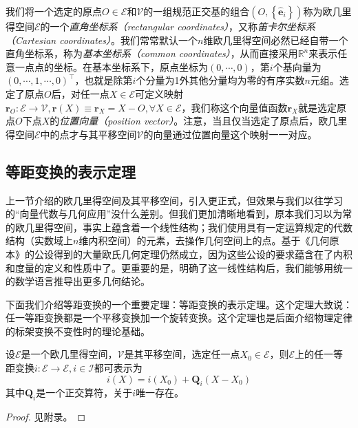 \documentclass[main.tex]{subfiles}
\begin{document}
我们将一个选定的原点$O\in\mathcal{E}$和$\mathcal{V}$的一组规范正交基的组合$\left(O,\left\{\mathbf{\hat{e}}_i\right\}\right)$称为欧几里得空间$\mathcal{E}$的一个\emph{直角坐标系（rectangular coordinates）}，又称\emph{笛卡尔坐标系（Cartesian coordinates）}。我们常常默认一个$n$维欧几里得空间必然已经自带一个直角坐标系，称为\emph{基本坐标系（common coordinates）}，从而直接采用$\mathbb{R}^n$来表示任意一点点的坐标。在基本坐标系下，原点坐标为$\left(0,\cdots,0\right)$，第$i$个基向量为$\left(0,\cdots,1,\cdots,0\right)^\intercal$，也就是除第$i$个分量为1外其他分量均为零的有序实数$n$元组。选定了原点$O$后，对任一点$X\in\mathcal{E}$可定义映射$\mathbf{r}_O:\mathcal{E}\rightarrow\mathcal{V},\mathbf{r}\left(X\right)\equiv\mathbf{r}_X=X-O,\forall X\in\mathcal{E}$，我们称这个向量值函数$\mathbf{r}_X$就是选定原点$O$下点$X$的\emph{位置向量（position vector）}。注意，当且仅当选定了原点后，欧几里得空间$\mathcal{E}$中的点才与其平移空间$\mathcal{V}$的向量通过位置向量这个映射一一对应。

\subsection{等距变换的表示定理}
上一节介绍的欧几里得空间及其平移空间，引入更正式，但效果与我们以往学习的“向量代数与几何应用”\cite[\S 6]{华工高数2009上}\cite[\S 3]{周胜林2012线性代数}没什么差别。但我们更加清晰地看到，原本我们习以为常的欧几里得空间，事实上蕴含着一个线性结构；我们使用具有一定运算规定的代数结构（实数域上$n$维内积空间）的元素，去操作几何空间上的点。基于《几何原本》的公设得到的大量欧氏几何定理仍然成立，因为这些公设的要求蕴含在了内积和度量的定义和性质中了\cite{Audin2002}。更重要的是，明确了这一线性结构后，我们能够用统一的数学语言推导出更多几何结论\cite{Berger1987}。

下面我们介绍等距变换的一个重要定理：等距变换的表示定理。这个定理大致说：任一等距变换都是一个平移变换加一个旋转变换。这个定理也是后面介绍物理定律的标架变换不变性时的理论基础。

\begin{theorem}[等距变换的表示定理]\label{thm:II.3.1}
    设$\mathcal{E}$是一个欧几里得空间，$\mathcal{V}$是其平移空间，选定任一点$X_0\in\mathcal{E}$，则$\mathcal{E}$上的任一等距变换$i:\mathcal{E}\rightarrow\mathcal{E},i\in\mathcal{I}$都可表示为
    \[
        i\left(X\right)=i\left(X_0\right)+\mathbf{Q}_i\left(X-X_0\right)
    \]
    其中$\mathbf{Q}_i$是一个正交算符，关于$i$唯一存在。
\end{theorem}
\begin{proof}
    见附录。
\end{proof}
\end{document}
